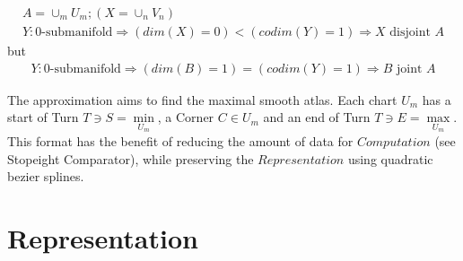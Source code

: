 \documentclass{report}
\begin{document}
\begin{align}
A = \cup_{m}U_{m}; (X = \cup_{n}V_{n})\\
Y: \text{0-submanifold} \Rightarrow (dim(X)=0)<(codim(Y)=1) \Rightarrow X \text{ disjoint } A
\end{align}
but
\begin{align}
Y: \text{0-submanifold} \Rightarrow (dim(B)=1)=(codim(Y)=1) \Rightarrow B \text{ joint } A
\end{align}
\iffalse
Within $f$ we are assigning a sequence of three points to compact Hausdorf invervals ~\cite[\nopp 6.1.3.]{Mortad}:
\begin{equation}
\{x_{n}\}_{n \in \mathbb{N}} \mapsto \{S,C,E\}
\end{equation}\\
\fi
The approximation aims to find the maximal smooth atlas. Each chart $U_{m}$ has a start of Turn $T \ni S = \min \limits _{U_{m}}$, a Corner $C \in U_{m}$ and an end of Turn $T \ni E = \max \limits _{U_{m}}$. This format has the benefit of reducing the amount of data for $Computation$ (see Stopeight Comparator), while preserving the $Representation$ using quadratic bezier splines.

\chapter{Representation}
\end{document}
